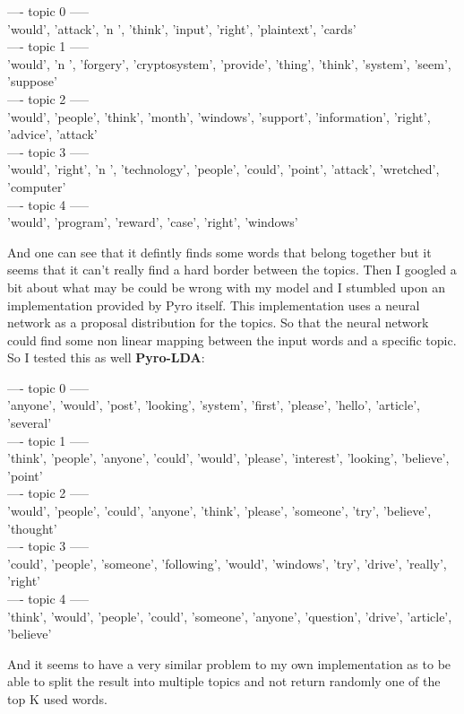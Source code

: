 \documentclass[10pt,conference,compsocconf]{IEEEtran}
\begin{document}
\begin{framed}
	---- topic 0 ----- \\ 
	'would', 'attack', 'n        ', 'think', 'input', 'right', 'plaintext', 'cards'\\
	---- topic 1 -----\\
	'would', 'n    ', 'forgery', 'cryptosystem', 'provide', 'thing', 'think', 'system', 'seem', 'suppose'\\
	---- topic 2 -----\\
	'would', 'people', 'think', 'month', 'windows', 'support', 'information', 'right', 'advice', 'attack'\\
	---- topic 3 -----\\
	'would', 'right', 'n        ', 'technology', 'people', 'could', 'point', 'attack', 'wretched', 'computer'\\
	---- topic 4 -----\\
	'would', 'program', 'reward', 'case', 'right', 'windows'
\end{framed}
 And one can see that it defintly finds some words that belong together but it seems that it can't really find a hard border between the topics. Then I googled a bit about what may be could be wrong with my model and I stumbled upon an implementation provided by Pyro itself. This implementation uses a neural network as a proposal distribution for the topics. So that the neural network could find some non linear mapping between the input words and a specific topic. So I tested this as well \textbf{Pyro-LDA}:
 \begin{framed}
 	---- topic 0 -----\\
 	'anyone', 'would', 'post', 'looking', 'system', 'first', 'please', 'hello', 'article', 'several'\\
 	---- topic 1 -----\\
 	'think', 'people', 'anyone', 'could', 'would', 'please', 'interest', 'looking', 'believe', 'point'\\
 	---- topic 2 -----\\
 	'would', 'people', 'could', 'anyone', 'think', 'please', 'someone', 'try', 'believe', 'thought'\\
 	---- topic 3 -----\\
 	'could', 'people', 'someone', 'following', 'would', 'windows', 'try', 'drive', 'really', 'right'\\
 	---- topic 4 -----\\
 	'think', 'would', 'people', 'could', 'someone', 'anyone', 'question', 'drive', 'article', 'believe'
 	\end{framed} 
And it seems to have a very similar problem to my own implementation as to be able to split the result into multiple topics and not return randomly one of the top K used words.
\end{document}
